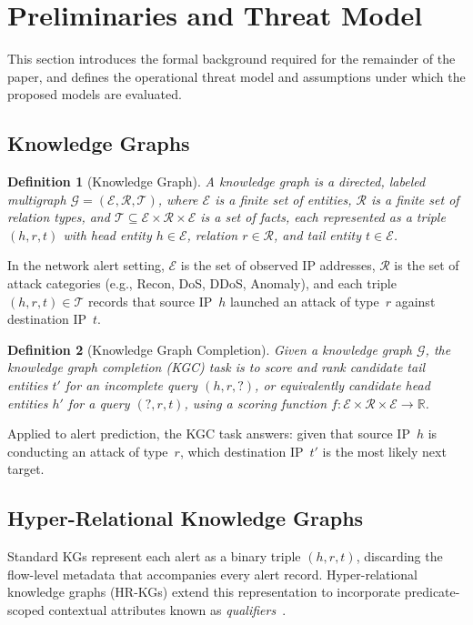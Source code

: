 \documentclass[10pt,journal,compsoc]{IEEEtran}
\newtheorem{definition}{Definition}[section]
\begin{document}
\section{Preliminaries and Threat Model}
\label{sec:preliminaries}

This section introduces the formal background required for the
remainder of the paper, and defines the operational threat model
and assumptions under which the proposed models are evaluated.


\subsection{Knowledge Graphs}
\label{ssec:kg}

\begin{definition}[Knowledge Graph]
\label{def:kg}
A knowledge graph is a directed, labeled multigraph
$\mathcal{G} = (\mathcal{E}, \mathcal{R}, \mathcal{T})$,
where $\mathcal{E}$ is a finite set of entities,
$\mathcal{R}$ is a finite set of relation types, and
$\mathcal{T} \subseteq \mathcal{E} \times \mathcal{R}
\times \mathcal{E}$ is a set of facts, each represented
as a triple $(h, r, t)$ with head entity $h \in \mathcal{E}$,
relation $r \in \mathcal{R}$, and tail entity $t \in \mathcal{E}$.
\end{definition}

In the network alert setting, $\mathcal{E}$ is the set of
observed IP addresses, $\mathcal{R}$ is the set of attack
categories (e.g., Recon, DoS, DDoS, Anomaly), and each triple
$(h, r, t) \in \mathcal{T}$ records that source IP~$h$ launched
an attack of type~$r$ against destination IP~$t$.

\begin{definition}[Knowledge Graph Completion]
\label{def:kgc}
Given a knowledge graph $\mathcal{G}$, the knowledge graph
completion (KGC) task is to score and rank candidate tail
entities $t'$ for an incomplete query $(h, r, ?)$, or
equivalently candidate head entities $h'$ for a query
$(?, r, t)$, using a scoring function
$f: \mathcal{E} \times \mathcal{R} \times \mathcal{E}
\rightarrow \mathbb{R}$.
\end{definition}

Applied to alert prediction, the KGC task answers: given that
source IP~$h$ is conducting an attack of type~$r$, which
destination IP~$t'$ is the most likely next target.


\subsection{Hyper-Relational Knowledge Graphs}
\label{ssec:hrkg}
Standard KGs represent each alert as a binary triple $(h, r, t)$,
discarding the flow-level metadata that accompanies every alert
record. Hyper-relational knowledge graphs (HR-KGs) extend this
representation to incorporate predicate-scoped contextual
attributes known as \emph{qualifiers}~\cite{galkin2020message}.
\end{document}

